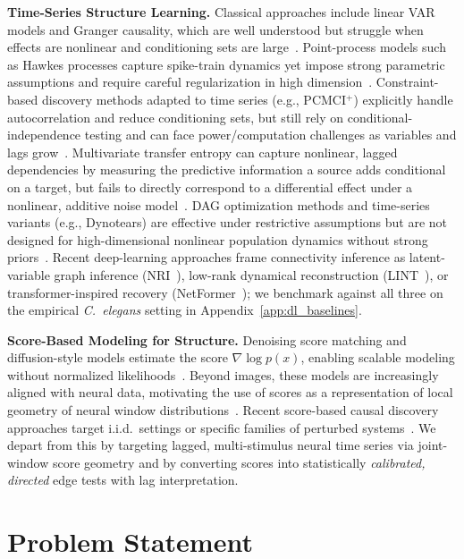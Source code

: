 \documentclass{article}
\theoremstyle{plain}
\theoremstyle{definition}
\theoremstyle{remark}
\newcommand{\1}{\mathbf{1}}
\begin{document}
\textbf{Time-Series Structure Learning.} Classical approaches include linear VAR models and Granger causality, which are well understood but struggle when effects are nonlinear and conditioning sets are large~\citep{Granger1969,Lutkepohl2005}. Point-process models such as Hawkes processes capture spike-train dynamics yet impose strong parametric assumptions and require careful regularization in high dimension~\citep{Hawkes1971}. Constraint-based discovery methods adapted to time series (e.g., PCMCI$^+$) explicitly handle autocorrelation and reduce conditioning sets, but still rely on conditional-independence testing and can face power/computation challenges as variables and lags grow~\citep{Runge2020PCMCIplus}. Multivariate transfer entropy can capture nonlinear, lagged dependencies by measuring the predictive information a source adds conditional on a target, but fails to directly correspond to a differential effect under a nonlinear, additive noise model~\citep{Novelli2019}. DAG optimization methods and time-series variants (e.g., Dynotears) are effective under restrictive assumptions but are not designed for high-dimensional nonlinear population dynamics without strong priors~\citep{pamfil2020dynotearsstructurelearningtimeseries,Zheng2018,Yu2019}. Recent deep-learning approaches frame connectivity inference as latent-variable graph inference (NRI~\citep{Kipf2018NRI}), low-rank dynamical reconstruction (LINT~\citep{Valente2022LINT}), or transformer-inspired recovery (NetFormer~\citep{Lu2025NetFormer}); we benchmark against all three on the empirical \emph{C.~elegans} setting in Appendix~\ref{app:dl_baselines}.

\textbf{Score-Based Modeling for Structure.} Denoising score matching and diffusion-style models estimate the score $\nabla \log p(x)$, enabling scalable modeling without normalized likelihoods~\citep{Hyvarinen2005,Vincent2011,SongErmon2019,Song2021}. Beyond images, these models are increasingly aligned with neural data, motivating the use of scores as a representation of local geometry of neural window distributions~\citep{Ozcelik2023,Kapoor2024}. Recent score-based causal discovery approaches target i.i.d.\ settings or specific families of perturbed systems~\citep{varici2023,MontagnaBerrett2023,Zhu2023}. We depart from this by targeting lagged, multi-stimulus neural time series via joint-window score geometry and by converting scores into statistically \emph{calibrated, directed} edge tests with lag interpretation.

\section{Problem Statement}
\label{sec:problem}
\end{document}
